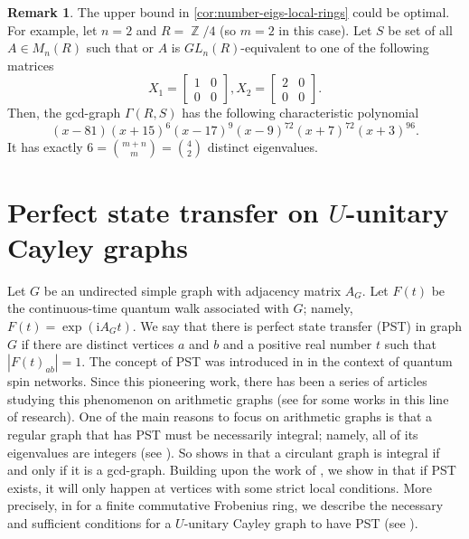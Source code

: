 \documentclass[12pt, a4paper]{amsart}
\theoremstyle{definition}
\newtheorem{rem}[thm]{Remark}
\DeclareMathOperator{\Z}{\mathbb{Z}}
\numberwithin{equation}{section}
\begin{document}
\begin{rem}
    The upper bound in \cref{cor:number-eigs-local-rings} could be optimal. For example, let $n=2$ and $R=\Z/4$ (so $m=2$ in this case). Let $S$ be set of all $A \in M_n(R)$ such that or $A$ is $GL_n(R)$-equivalent to one of the following matrices 
    \[ X_1 = \begin{bmatrix}
        1 & 0 \\  0 & 0 
    \end{bmatrix}, X_2 =\begin{bmatrix}
        2 & 0 \\  0 & 0 
    \end{bmatrix}.  \]
Then, the gcd-graph $\Gamma(R,S)$ has the following characteristic polynomial 
\[ (x - 81)  (x + 15)^6 (x - 17)^9 (x - 9)^{72}  (x + 7)^{72}  (x + 3)^{96} . \]
It has exactly $6 = {m+n \choose m} = {4 \choose 2} $ distinct eigenvalues. 
    
\end{rem}

\section{Perfect state transfer on $U$-unitary Cayley graphs}
Let $G$ be an undirected simple graph with adjacency matrix $A_G$. Let $F(t)$ be the continuous-time quantum walk associated with $G$; namely, $F(t) = \exp(\mathrm{i}A_G t)$. We say that there is perfect state transfer (PST) in graph $G$ if there are distinct vertices $a$ and $b$ and a positive real number $t$ such that $|F(t)_{ab}| = 1$. The concept of PST was introduced in \cite{christandl2004perfect} in the context of quantum spin networks. Since this pioneering work, there has been a series of articles studying this phenomenon on arithmetic graphs (see \cite{bavsic2009perfect, cheung2011perfect, godsil2012state, saxena2007parameters} for some works in this line of research). One of the main reasons to focus on arithmetic graphs is that a regular graph that has PST must be necessarily integral; namely, all of its eigenvalues are integers (see \cite{godsil2012state, saxena2007parameters}). So shows in \cite{so2006integral} that a circulant graph is integral if and only if it is a gcd-graph. Building upon the work of \cite{bavsic2009perfect, bavsic2013characterization, saxena2007parameters}, we show in \cite[Theorem 3.5]{nguyen_pst} that if PST exists, it will only happen at vertices with some strict local conditions. More precisely, in \cite{nguyen_pst} for a finite commutative Frobenius ring, we describe the necessary and sufficient conditions for a $U$-unitary Cayley graph to have PST (see \cite[Theorem 2.2]{nguyen_pst}). 
\end{document}
